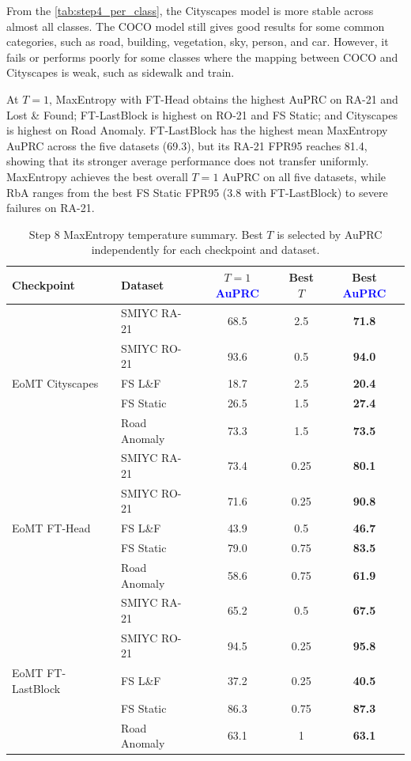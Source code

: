 \documentclass[10pt,twocolumn,letterpaper]{article}
\begin{document}
From the \cref{tab:step4_per_class}, the Cityscapes model is more stable across almost all classes. The COCO model still gives good results for some common categories, such as road, building, vegetation, sky, person, and car. However, it fails or performs poorly for some classes where the mapping between COCO and Cityscapes is weak, such as sidewalk and train.

At $T=1$, MaxEntropy with FT-Head obtains the highest AuPRC on RA-21 and Lost \& Found; FT-LastBlock is highest on RO-21 and FS Static; and Cityscapes is highest on Road Anomaly. FT-LastBlock has the highest mean MaxEntropy AuPRC across the five datasets (69.3), but its RA-21 FPR95 reaches 81.4, showing that its stronger average performance does not transfer uniformly. MaxEntropy achieves the best overall $T=1$ AuPRC on all five datasets, while RbA ranges from the best FS Static FPR95 (3.8 with FT-LastBlock) to severe failures on RA-21.

\begin{table}[t]
\centering
\caption{Step 8 MaxEntropy temperature summary. Best $T$ is selected by AuPRC independently for each checkpoint and dataset.}
\label{tab:temperature_results}
\setlength{\tabcolsep}{3pt}
\scriptsize
\begin{tabular}{llccc}
\toprule
Checkpoint & Dataset & $T{=}1$ \textcolor{blue}{AuPRC} & Best $T$ & Best \textcolor{blue}{AuPRC} \\
\midrule
 & SMIYC RA-21 & 68.5 & 2.5 & \textbf{71.8} \\
 & SMIYC RO-21 & 93.6 & 0.5 & \textbf{94.0} \\
 EoMT Cityscapes & FS L\&F & 18.7 & 2.5 & \textbf{20.4} \\
 & FS Static & 26.5 & 1.5 & \textbf{27.4} \\
 & Road Anomaly & 73.3 & 1.5 & \textbf{73.5} \\
\midrule
 & SMIYC RA-21 & 73.4 & 0.25 & \textbf{80.1} \\
 & SMIYC RO-21 & 71.6 & 0.25 & \textbf{90.8} \\
 EoMT FT-Head & FS L\&F & 43.9 & 0.5 & \textbf{46.7} \\
 & FS Static & 79.0 & 0.75 & \textbf{83.5} \\
 & Road Anomaly & 58.6 & 0.75 & \textbf{61.9} \\
\midrule
 & SMIYC RA-21 & 65.2 & 0.5 & \textbf{67.5} \\
 & SMIYC RO-21 & 94.5 & 0.25 & \textbf{95.8} \\
 EoMT FT-LastBlock & FS L\&F & 37.2 & 0.25 & \textbf{40.5} \\
 & FS Static & 86.3 & 0.75 & \textbf{87.3} \\
 & Road Anomaly & 63.1 & 1 & \textbf{63.1} \\
\bottomrule
\end{tabular}
\end{table}
\end{document}
